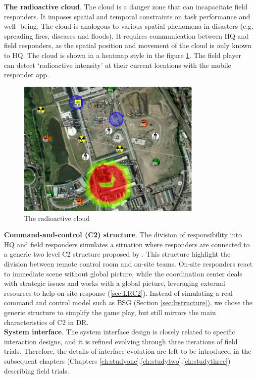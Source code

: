 \textbf{The radioactive cloud}. The cloud is a danger zone that can incapacitate field responders. It imposes spatial and temporal constraints on task performance and well- being. The cloud is analogous to various spatial phenomena in disasters (e.g. spreading fires, diseases and floods). It requires communication between HQ and field responders, as the spatial position and movement of the cloud is only known to HQ. The cloud is shown in a heatmap style in the figure \ref{fig:cloud}. The field player can detect `radioactive intensity' at their current locations with the mobile responder app.\\

\begin{figure}[h]
  \centering
  \includegraphics[width=0.8\textwidth]{img/approach/radioactiveCloud}
  \caption{The radioactive cloud}
  \label{fig:cloud}
\end{figure}

\textbf{Command-and-control (C2) structure}. The division of responsibility into HQ and field responders simulates a situation where  responders are connected to a generic two level \ac{C2} structure proposed by \cite{Chen2005}. This structure highlight the division between remote control room and on-site teams.  On-site responders react to immediate scene without global picture, while the coordination center deals with strategic issues and works with a global picture, leveraging external resources to help on-site response (\ref{sec:LRC2}). Instead of simulating a real command and control model such as \ac{BSG} (Section \ref{sec:lrstructure}), we chose the generic structure to simplify the game play, but still mirrors the main characteristics of \ac{C2} in \ac{DR}. \\

\textbf{System interface}. The system interface design is closely related to specific interaction designs, and it is refined evolving through three iterations of field trials. Therefore, the details of interface evolution are left to be introduced in the subsequent chapters (Chapters \ref{ch:studyone},\ref{ch:studytwo},\ref{ch:studythree}) describing field trials. \\



